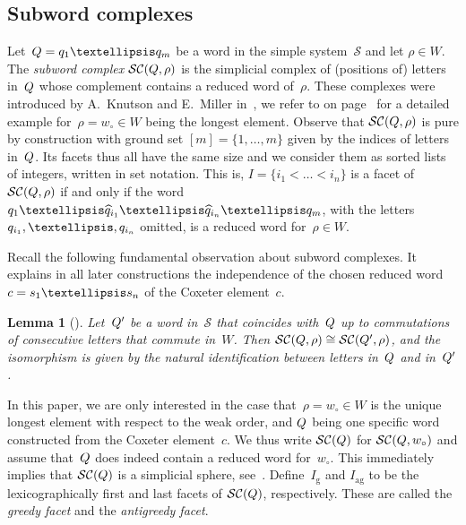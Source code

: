 \documentclass[10pt]{amsart}
\newtheorem{lemm}[theo]{Lemma}\newtheorem{prop}[theo]{Proposition}\newtheorem{coro}[theo]{Corollary}\newtheorem{conj}[theo]{Conjecture}
\theoremstyle{definition}\newtheorem{rema}[theo]{Remark}\newtheorem{exem}[theo]{Example}
\newcommand{\Dfn}[1]{\emph{#1}}
\newcommand{\subwordComplex}{\mathcal{SC}}
\newcommand{\greedy}{I_{\operatorname{g}}}
\newcommand{\antigreedy}{I_{\operatorname{ag}}}
\newcommand{\sq}[1]{{\rm #1}}
\newcommand{\Q}{\sq{Q}}
\newcommand{\q}{\sq{q}}
\newcommand{\s}{\sq{s}}
\newcommand{\sref}{\mathcal{S}}
\newcommand{\wo}{{w_\circ}}
\renewcommand{\c}{\sq{c}}
\begin{document}
\subsection{Subword complexes}\label{sec:subwordcomplexes}

Let~$\Q = \q_1\dots\q_m$ be a word in the simple system~$\sref$ and let $\rho \in W$. The \Dfn{subword complex} $\subwordComplex(\Q,\rho)$ is the simplicial complex of (positions of) letters in~$\Q$ whose complement contains a reduced word of~$\rho$. These complexes were introduced by A.~Knutson and E.~Miller in~\cite{KM2004}, we refer to  on page~\pageref{ex:subwordA2} for a detailed example for~$\rho = \wo \in W$ being the longest element. Observe that $\subwordComplex(\Q,\rho)$ is pure by construction with ground set $[m] = \{1,\dots,m\}$ given by the indices of letters in~$\Q$. Its facets thus all have the same size and we consider them as sorted lists of integers, written in set notation. This is, $I = \{i_1 < \dots < i_n\}$ is a facet of $\subwordComplex(\Q,\rho)$ if and only if the word $\q_1\dots \widehat \q_{i_1} \dots \widehat \q_{i_n} \dots \q_m$, with the letters $\q_{i_1},\dots,\q_{i_n}$ omitted, is a reduced word for~$\rho \in W$.


Recall the following fundamental observation about subword complexes. It explains in all later constructions the independence of the chosen reduced word~$\c = \s_1\dots\s_n$ of the Coxeter element~$c$.

\begin{lemm}[{\cite[Proposition~3.8]{CLS2014}}]\label{lem:commutation}
Let~$\Q'$ be a word in~$\sref$ that coincides with~$\Q$ up to commutations of consecutive letters that commute in~$W$. Then $\subwordComplex(\Q,\rho) \cong \subwordComplex(\Q',\rho)$, and the isomorphism is given by the natural identification between letters in~$\Q$ and in~$\Q'$.
\end{lemm}

In this paper, we are only interested in the case that~$\rho = \wo \in W$ is the unique longest element with respect to the weak order, and $\Q$ being one specific word constructed from the Coxeter element~$c$. We thus write $\subwordComplex(\Q)$ for $\subwordComplex(\Q,\wo)$ and assume that~$\Q$ does indeed contain a reduced word for~$\wo$. This immediately implies that $\subwordComplex(\Q)$ is a simplicial sphere, see~\cite[Theorem~3.7]{KM2004}. Define~$\greedy$ and $\antigreedy$ to be the lexicographically first and last facets of $\subwordComplex(\Q)$, respectively. These are called the \Dfn{greedy facet} and the \Dfn{antigreedy facet}.
\end{document}

